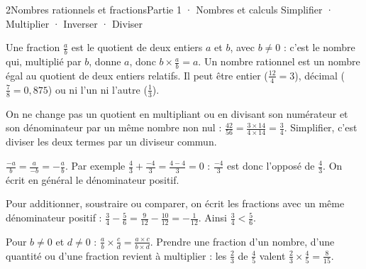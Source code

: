 \begin{ouverture}[calcul]{2}{Nombres rationnels et fractions}{Partie 1 · Nombres et calculs}
{Simplifier · Multiplier · Inverser · Diviser}
\end{ouverture}
\pagestyle{otMain}\essentiel\fontsize{11}{15}\selectfont
{}\label{cours-2-1}
\begin{definition}Une fraction $\frac ab$ est le quotient de deux entiers $a$ et $b$, avec $b\ne0$ : c’est le nombre qui, multiplié par $b$, donne $a$, donc $b\times\frac ab=a$. Un nombre rationnel est un nombre égal au quotient de deux entiers relatifs. Il peut être entier ($\frac{12}4=3$), décimal ($\frac78=0{,}875$) ou ni l’un ni l’autre ($\frac13$).\end{definition}
\begin{propriete}[Simplifier]On ne change pas un quotient en multipliant ou en divisant son numérateur et son dénominateur par un même nombre non nul : $\frac{42}{56}=\frac{3\times14}{4\times14}=\frac34$. Simplifier, c’est diviser les deux termes par un diviseur commun.\end{propriete}
\begin{propriete}$\frac{-a}{b}=\frac{a}{-b}=-\frac ab$. Par exemple $\frac43+\frac{-4}3=\frac{4-4}3=0$ : $\frac{-4}3$ est donc l’opposé de $\frac43$. On écrit en général le dénominateur positif.\end{propriete}
\begin{exemple}Pour additionner, soustraire ou comparer, on écrit les fractions avec un même dénominateur positif : $\frac34-\frac56=\frac9{12}-\frac{10}{12}=-\frac1{12}$. Ainsi $\frac34<\frac56$.\end{exemple}
\clearpage
{}\label{cours-2-2}
\begin{propriete}Pour $b\ne0$ et $d\ne0$ : $\frac ab\times\frac cd=\frac{a\times c}{b\times d}$. Prendre une fraction d’un nombre, d’une quantité ou d’une fraction revient à multiplier : les $\frac23$ de $\frac45$ valent $\frac23\times\frac45=\frac8{15}$.\end{propriete}
\label{fig-cours-2-2-cours-fraction-fraction}

